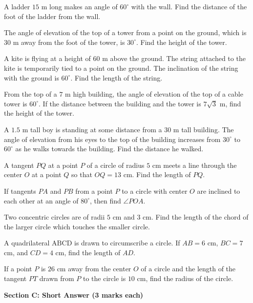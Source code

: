 \documentclass[12pt,a4paper]{exam}
\begin{document}
\begin{questions}
\question[2] A ladder $15 \text{ m}$ long makes an angle of $60^\circ$ with the wall. Find the distance of the foot of the ladder from the wall.
\vspace{0.15cm}

\question[2] The angle of elevation of the top of a tower from a point on the ground, which is $30 \text{ m}$ away from the foot of the tower, is $30^\circ$. Find the height of the tower.
\vspace{0.15cm}

\question[2] A kite is flying at a height of $60 \text{ m}$ above the ground. The string attached to the kite is temporarily tied to a point on the ground. The inclination of the string with the ground is $60^\circ$. Find the length of the string.
\vspace{0.15cm}

\question[2] From the top of a $7 \text{ m}$ high building, the angle of elevation of the top of a cable tower is $60^\circ$. If the distance between the building and the tower is $7\sqrt{3} \text{ m}$, find the height of the tower.
\vspace{0.15cm}

\question[2] A $1.5 \text{ m}$ tall boy is standing at some distance from a $30 \text{ m}$ tall building. The angle of elevation from his eyes to the top of the building increases from $30^\circ$ to $60^\circ$ as he walks towards the building. Find the distance he walked.
\vspace{0.15cm}

\question[2] A tangent $PQ$ at a point $P$ of a circle of radius $5$ cm meets a line through the center $O$ at a point $Q$ so that $OQ = 13$ cm. Find the length of $PQ$.
\vspace{0.15cm}

\question[2] If tangents $PA$ and $PB$ from a point $P$ to a circle with center $O$ are inclined to each other at an angle of $80^\circ$, then find $\angle POA$.
\vspace{0.15cm}

\question[2] Two concentric circles are of radii $5$ cm and $3$ cm. Find the length of the chord of the larger circle which touches the smaller circle.
\vspace{0.15cm}

\question[2] A quadrilateral $\text{ABCD}$ is drawn to circumscribe a circle. If $AB = 6$ cm, $BC = 7$ cm, and $CD = 4$ cm, find the length of $AD$.
\vspace{0.15cm}

\question[2] If a point $P$ is $26$ cm away from the center $O$ of a circle and the length of the tangent $PT$ drawn from $P$ to the circle is $10$ cm, find the radius of the circle.
\vspace{0.15cm}

\end{questions}
\bigskip
\noindent\textbf{\large Section C: Short Answer (3 marks each)}
\end{document}
